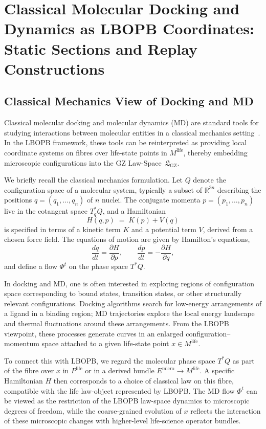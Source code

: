\documentclass[11pt]{book}
\theoremstyle{plain}
\theoremstyle{definition}
\theoremstyle{remark}
\newcommand{\GZLS}{\ensuremath{\mathfrak{L}_{\mathrm{GZ}}}}       \newcommand{\GZLT}{\ensuremath{M_{!w}}}                           \newcommand{\GZLOC}{\ensuremath{A_M}}                             \newcommand{\GZLCurv}{\ensuremath{\mathcal{F}_{\mathrm{law}}}}
\begin{document}
\chapter[Classical Molecular Docking and Dynamics as LBOPB Coordinates]{Classical Molecular Docking and Dynamics as LBOPB Coordinates:\\
         Static Sections and Replay Constructions}


\section{Classical Mechanics View of Docking and MD}


Classical molecular docking and molecular dynamics (MD) are standard
tools for studying interactions between molecular entities in a
classical mechanics setting~\cite{Abraham2015GROMACS}. In the LBOPB framework, these tools can
be reinterpreted as providing local coordinate systems on fibres over
life-state points in $M^{\mathrm{life}}$, thereby embedding microscopic
configurations into the GZ Law-Space~$\GZLS$.

We briefly recall the classical mechanics formulation. Let $Q$ denote
the configuration space of a molecular system, typically a subset of
$\mathbb{R}^{3n}$ describing the positions $q = (q_{1},\dots,q_{n})$ of
$n$ nuclei. The conjugate momenta $p = (p_{1},\dots,p_{n})$ live in
the cotangent space $T^{*}_{q}Q$, and a Hamiltonian
\[
  H(q,p) \;=\; K(p) + V(q)
\]
is specified in terms of a kinetic term $K$ and a potential term $V$,
derived from a chosen force field. The equations of motion are given by
Hamilton’s equations,
\[
  \frac{dq}{dt} = \frac{\partial H}{\partial p},
  \qquad
  \frac{dp}{dt} = -\frac{\partial H}{\partial q},
\]
and define a flow $\Phi^{t}$ on the phase space $T^{*}Q$.

In docking and MD, one is often interested in exploring regions of
configuration space corresponding to bound states, transition states,
or other structurally relevant configurations. Docking algorithms
search for low-energy arrangements of a ligand in a binding region;
MD trajectories explore the local energy landscape and thermal
fluctuations around these arrangements. From the LBOPB viewpoint,
these processes generate curves in an enlarged configuration–momentum
space attached to a given life-state point $x \in M^{\mathrm{life}}$.

To connect this with LBOPB, we regard the molecular phase space
$T^{*}Q$ as part of the fibre over $x$ in $P^{\mathrm{life}}$ or in a
derived bundle $E^{\mathrm{micro}} \to M^{\mathrm{life}}$. A specific
Hamiltonian $H$ then corresponds to a choice of classical law on this
fibre, compatible with the life law-object represented by LBOPB. The
MD flow $\Phi^{t}$ can be viewed as the restriction of the LBOPB
law-space dynamics to microscopic degrees of freedom, while the
coarse-grained evolution of $x$ reflects the interaction of these
microscopic changes with higher-level life-science operator bundles.
\end{document}
